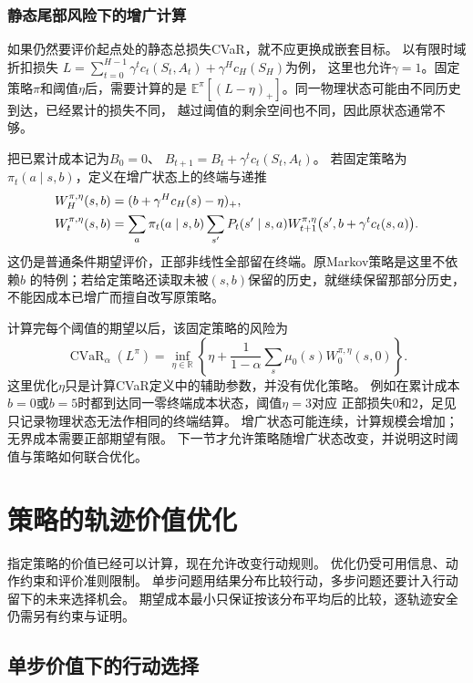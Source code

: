 \subsubsection{静态尾部风险下的增广计算}
\label{sec:policy-static-cvar-evaluation}

如果仍然要评价起点处的静态总损失CVaR，就不应更换成嵌套目标。
以有限时域折扣损失
$L=\sum_{t=0}^{H-1}\gamma^tc_t(S_t,A_t)+\gamma^Hc_H(S_H)$为例，
这里也允许$\gamma=1$。固定策略$\pi$和阈值$\eta$后，需要计算的是
$\mathbb E^\pi[(L-\eta)_+]$。同一物理状态可能由不同历史到达，已经累计的损失不同，
越过阈值的剩余空间也不同，因此原状态通常不够。

把已累计成本记为$B_0=0$、
$B_{t+1}=B_t+\gamma^tc_t(S_t,A_t)$。
若固定策略为$\pi_t(a\mid s,b)$，定义在增广状态上的终端与递推
\begin{align}
  W_H^{\pi,\eta}(s,b)&=(b+\gamma^Hc_H(s)-\eta)_+,\notag\\
  W_t^{\pi,\eta}(s,b)
  &=\sum_a\pi_t(a\mid s,b)\sum_{s'}P_t(s'\mid s,a)
    W_{t+1}^{\pi,\eta}\bigl(s',b+\gamma^tc_t(s,a)\bigr).
  \label{eq:policy-static-cvar-augmented-evaluation}
\end{align}
这仍是普通条件期望评价，正部非线性全部留在终端。原Markov策略是这里不依赖$b$
的特例；若给定策略还读取未被$(s,b)$保留的历史，就继续保留那部分历史，
不能因成本已增广而擅自改写原策略。

计算完每个阈值的期望以后，该固定策略的风险为
\[
  \operatorname{CVaR}_\alpha(L^\pi)
  =\inf_{\eta\in\mathbb R}
    \left\{\eta+\frac{1}{1-\alpha}
      \sum_s\mu_0(s)W_0^{\pi,\eta}(s,0)\right\}.
\]
这里优化$\eta$只是计算CVaR定义中的辅助参数，并没有优化策略。
例如在累计成本$b=0$或$b=5$时都到达同一零终端成本状态，阈值$\eta=3$对应
正部损失$0$和$2$，足见只记录物理状态无法作相同的终端结算。
增广状态可能连续，计算规模会增加；无界成本需要正部期望有限。
下一节才允许策略随增广状态改变，并说明这时阈值与策略如何联合优化。

\section{策略的轨迹价值优化}
\label{sec:policy-value-optimization}

指定策略的价值已经可以计算，现在允许改变行动规则。
优化仍受可用信息、动作约束和评价准则限制。
单步问题用结果分布比较行动，多步问题还要计入行动留下的未来选择机会。
期望成本最小只保证按该分布平均后的比较，逐轨迹安全仍需另有约束与证明。

\subsection{单步价值下的行动选择}
\label{sec:decision-bayes-rules}

